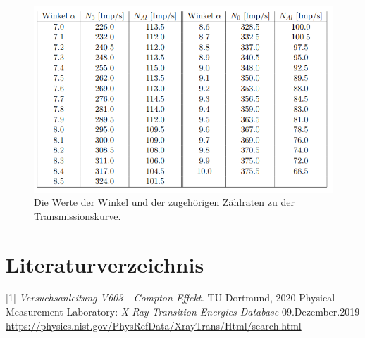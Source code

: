 \documentclass[titlepage = firstcover]{scrartcl}
\begin{document}
        \FloatBarrier

        \begin{figure}
          \centering
          \includegraphics[width = 1.1\linewidth]{Tabelle_Transmission.png}
          \caption{Die Werte der Winkel und der zugehörigen Zählraten zu der Transmissionskurve.}
          \label{fig:transmissionstabelle}
        \end{figure}
        \FloatBarrier

        \section{Literaturverzeichnis}
        [1] \textit{Versuchsanleitung V603 - Compton-Effekt.} TU Dortmund, 2020 \newline
        [2] Physical Measurement Laboratory: \textit{X-Ray Transition Energies Database} 09.Dezember.2019
        \url{https://physics.nist.gov/PhysRefData/XrayTrans/Html/search.html}
\end{document}
